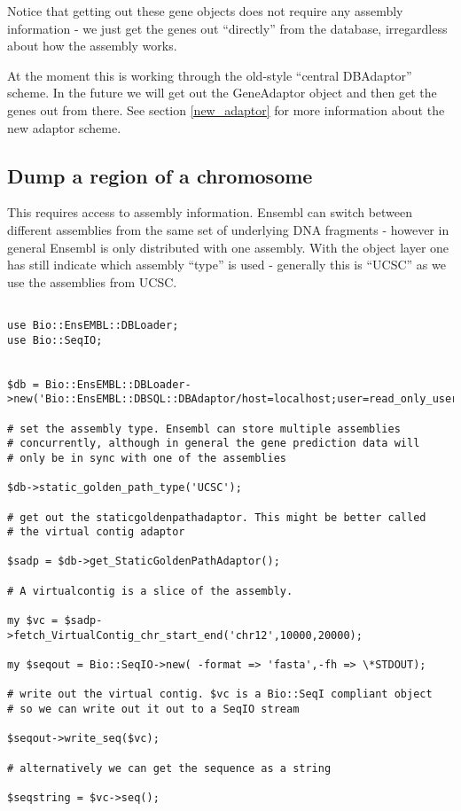 \documentclass[11pt,a4paper]{article}
\begin{document}
Notice that getting out these gene objects does not require any
assembly information - we just get the genes out ``directly'' from the
database, irregardless about how the assembly works.

At the moment this is working through the old-style ``central
DBAdaptor'' scheme. In the future we will get out the GeneAdaptor
object and then get the genes out from there. See section \ref{new_adaptor}
for more information about the new adaptor scheme.


\subsection{Dump a region of a chromosome}

This requires access to assembly information. Ensembl can switch
between different assemblies from the same set of underlying DNA
fragments - however in general Ensembl is only distributed with
one assembly. With the object layer one has still indicate which
assembly ``type'' is used - generally this is ``UCSC'' as we use
the assemblies from UCSC.


\begin{verbatim}

use Bio::EnsEMBL::DBLoader;
use Bio::SeqIO;


$db = Bio::EnsEMBL::DBLoader->new('Bio::EnsEMBL::DBSQL::DBAdaptor/host=localhost;user=read_only_user;dbname=test_ensembl');

# set the assembly type. Ensembl can store multiple assemblies
# concurrently, although in general the gene prediction data will
# only be in sync with one of the assemblies

$db->static_golden_path_type('UCSC');

# get out the staticgoldenpathadaptor. This might be better called
# the virtual contig adaptor

$sadp = $db->get_StaticGoldenPathAdaptor();

# A virtualcontig is a slice of the assembly.

my $vc = $sadp->fetch_VirtualContig_chr_start_end('chr12',10000,20000);

my $seqout = Bio::SeqIO->new( -format => 'fasta',-fh => \*STDOUT);

# write out the virtual contig. $vc is a Bio::SeqI compliant object
# so we can write out it out to a SeqIO stream

$seqout->write_seq($vc);

# alternatively we can get the sequence as a string

$seqstring = $vc->seq();

\end{verbatim}
\end{document}
